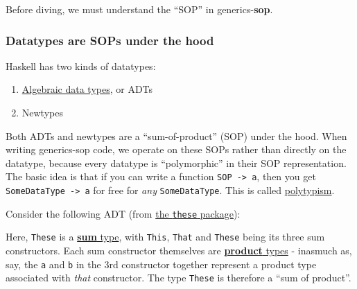 Before diving, we must understand the ``SOP'' in generics-\textbf{sop}.

\hypertarget{datatypes-are-sops-under-the-hood}{%
\subsubsection{Datatypes are SOPs under the
hood}\label{datatypes-are-sops-under-the-hood}}

Haskell has two kinds of datatypes:

\begin{enumerate}
\def\labelenumi{\arabic{enumi}.}
\tightlist
\item
  \href{https://en.wikipedia.org/wiki/Algebraic_data_type}{Algebraic
  data types}, or ADTs
\item
  Newtypes
\end{enumerate}

Both ADTs and newtypes are a ``sum-of-product'' (SOP) under the hood.
When writing generics-sop code, we operate on these SOPs rather than
directly on the datatype, because every datatype is ``polymorphic'' in
their SOP representation. The basic idea is that if you can write a
function \texttt{SOP\ -\textgreater{}\ a}, then you get
\texttt{SomeDataType\ -\textgreater{}\ a} for free for \emph{any}
\texttt{SomeDataType}. This is called
\href{https://en.wikipedia.org/wiki/Polymorphism_(computer_science)\#Polytypism}{polytypism}.

Consider the following ADT (from
\href{https://hackage.haskell.org/package/these-1.1.1.1/docs/Data-These.html}{the
\texttt{these} package}):

\begin{Shaded}
\begin{Highlighting}[]
 
  \OtherTok{=} 
  \OperatorTok{|} 
  \OperatorTok{|} 
\end{Highlighting}
\end{Shaded}

Here, \texttt{These} is a
\href{https://en.wikipedia.org/wiki/Tagged_union}{\textbf{sum} type},
with \texttt{This}, \texttt{That} and \texttt{These} being its three sum
constructors. Each sum constructor themselves are
\href{https://en.wikipedia.org/wiki/Product_type}{\textbf{product}
types} - inasmuch as, say, the \texttt{a} and \texttt{b} in the 3rd
constructor together represent a product type associated with
\emph{that} constructor. The type \texttt{These} is therefore a ``sum of
product''.

